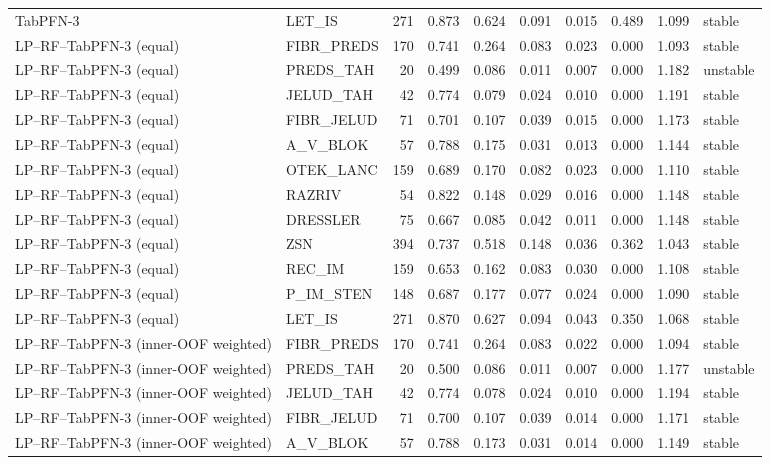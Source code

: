 \begin{longtable}{llrrrrrrrl}
TabPFN-3 & LET\_IS & 271 & 0.873 & 0.624 & 0.091 & 0.015 & 0.489 & 1.099 & stable \\
LP--RF--TabPFN-3 (equal) & FIBR\_PREDS & 170 & 0.741 & 0.264 & 0.083 & 0.023 & 0.000 & 1.093 & stable \\
LP--RF--TabPFN-3 (equal) & PREDS\_TAH & 20 & 0.499 & 0.086 & 0.011 & 0.007 & 0.000 & 1.182 & unstable \\
LP--RF--TabPFN-3 (equal) & JELUD\_TAH & 42 & 0.774 & 0.079 & 0.024 & 0.010 & 0.000 & 1.191 & stable \\
LP--RF--TabPFN-3 (equal) & FIBR\_JELUD & 71 & 0.701 & 0.107 & 0.039 & 0.015 & 0.000 & 1.173 & stable \\
LP--RF--TabPFN-3 (equal) & A\_V\_BLOK & 57 & 0.788 & 0.175 & 0.031 & 0.013 & 0.000 & 1.144 & stable \\
LP--RF--TabPFN-3 (equal) & OTEK\_LANC & 159 & 0.689 & 0.170 & 0.082 & 0.023 & 0.000 & 1.110 & stable \\
LP--RF--TabPFN-3 (equal) & RAZRIV & 54 & 0.822 & 0.148 & 0.029 & 0.016 & 0.000 & 1.148 & stable \\
LP--RF--TabPFN-3 (equal) & DRESSLER & 75 & 0.667 & 0.085 & 0.042 & 0.011 & 0.000 & 1.148 & stable \\
LP--RF--TabPFN-3 (equal) & ZSN & 394 & 0.737 & 0.518 & 0.148 & 0.036 & 0.362 & 1.043 & stable \\
LP--RF--TabPFN-3 (equal) & REC\_IM & 159 & 0.653 & 0.162 & 0.083 & 0.030 & 0.000 & 1.108 & stable \\
LP--RF--TabPFN-3 (equal) & P\_IM\_STEN & 148 & 0.687 & 0.177 & 0.077 & 0.024 & 0.000 & 1.090 & stable \\
LP--RF--TabPFN-3 (equal) & LET\_IS & 271 & 0.870 & 0.627 & 0.094 & 0.043 & 0.350 & 1.068 & stable \\
LP--RF--TabPFN-3 (inner-OOF weighted) & FIBR\_PREDS & 170 & 0.741 & 0.264 & 0.083 & 0.022 & 0.000 & 1.094 & stable \\
LP--RF--TabPFN-3 (inner-OOF weighted) & PREDS\_TAH & 20 & 0.500 & 0.086 & 0.011 & 0.007 & 0.000 & 1.177 & unstable \\
LP--RF--TabPFN-3 (inner-OOF weighted) & JELUD\_TAH & 42 & 0.774 & 0.078 & 0.024 & 0.010 & 0.000 & 1.194 & stable \\
LP--RF--TabPFN-3 (inner-OOF weighted) & FIBR\_JELUD & 71 & 0.700 & 0.107 & 0.039 & 0.014 & 0.000 & 1.171 & stable \\
LP--RF--TabPFN-3 (inner-OOF weighted) & A\_V\_BLOK & 57 & 0.788 & 0.173 & 0.031 & 0.014 & 0.000 & 1.149 & stable \\

\end{longtable}
